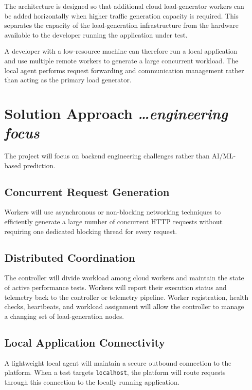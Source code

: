 \documentclass[11pt,a4paper]{article}
\newcommand{\BvrHint}[1]{%
  {\normalfont\normalsize\itshape\hfill #1}}
\begin{document}
The architecture is designed so that additional cloud
load-generator workers can be added horizontally when higher traffic
generation capacity is required. This separates the capacity of the
load-generation infrastructure from the hardware available to the
developer running the application under test.

A developer with a low-resource machine can therefore run a local
application and use multiple remote workers to generate a large
concurrent workload. The local agent performs request forwarding and
communication management rather than acting as the primary load
generator.

\section{Solution Approach%
  \BvrHint{\ldots engineering focus}}

The project will focus on backend engineering challenges rather than
AI/ML-based prediction.

\subsection{Concurrent Request Generation}

Workers will use asynchronous or non-blocking networking techniques
to efficiently generate a large number of concurrent HTTP requests
without requiring one dedicated blocking thread for every request.

\subsection{Distributed Coordination}

The controller will divide workload among cloud workers and maintain
the state of active performance tests. Workers will report their
execution status and telemetry back to the controller or telemetry
pipeline. Worker registration, health checks, heartbeats, and
workload assignment will allow the controller to manage a changing
set of load-generation nodes.

\subsection{Local Application Connectivity}

A lightweight local agent will maintain a secure outbound connection
to the platform. When a test targets \texttt{localhost}, the platform
will route requests through this connection to the locally running
application.
\end{document}
